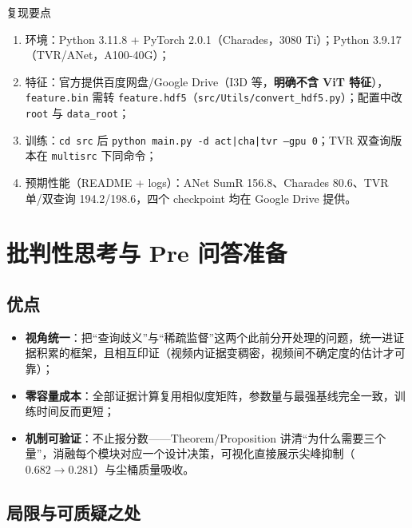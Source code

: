 \documentclass[11pt,a4paper,UTF8,fontset=windows]{ctexart}
\newcommand{\code}[1]{\texttt{#1}}
\newcommand{\term}[1]{\textbf{#1}}
\begin{document}
\begin{greybox}{复现要点}
\begin{enumerate}[itemsep=1pt,topsep=2pt]
  \item 环境：Python 3.11.8 + PyTorch 2.0.1（Charades，3080 Ti）；Python 3.9.17（TVR/ANet，A100-40G）；
  \item 特征：官方提供百度网盘/Google Drive（I3D 等，\term{明确不含 ViT 特征}），\code{feature.bin} 需转 \code{feature.hdf5}（\code{src/Utils/convert\_hdf5.py}）；配置中改 \code{root} 与 \code{data\_root}；
  \item 训练：\code{cd src} 后 \code{python main.py -d act|cha|tvr --gpu 0}；TVR 双查询版本在 \code{multisrc} 下同命令；
  \item 预期性能（README + logs）：ANet SumR 156.8、Charades 80.6、TVR 单/双查询 194.2/198.6，四个 checkpoint 均在 Google Drive 提供。
\end{enumerate}
\end{greybox}

\section{批判性思考与 Pre 问答准备}

\subsection{优点}

\begin{itemize}[itemsep=1pt,topsep=2pt]
  \item \term{视角统一}：把“查询歧义”与“稀疏监督”这两个此前分开处理的问题，统一进证据积累的框架，且相互印证（视频内证据变稠密，视频间不确定度的估计才可靠）；
  \item \term{零容量成本}：全部证据计算复用相似度矩阵，参数量与最强基线完全一致，训练时间反而更短；
  \item \term{机制可验证}：不止报分数——Theorem/Proposition 讲清“为什么需要三个量”，消融每个模块对应一个设计决策，可视化直接展示尖峰抑制（$0.682\to0.281$）与尘桶质量吸收。
\end{itemize}

\subsection{局限与可质疑之处}
\end{document}
